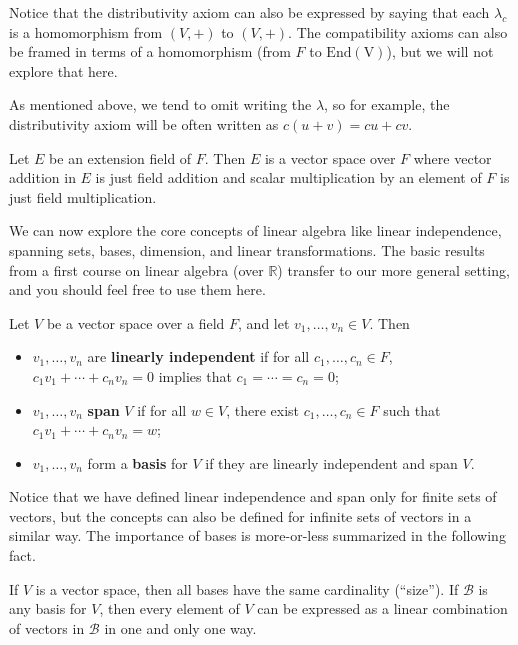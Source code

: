Notice that the distributivity axiom can also be expressed by saying that each $\lambda_c$ is a homomorphism from $(V,+)$ to $(V,+)$. The compatibility axioms can also be framed in terms of a homomorphism (from $F$ to $\operatorname{End(V)}$), but we will not explore that here.

As mentioned above, we tend to omit writing the $\lambda$, so for example, the distributivity axiom will be often written as $c(u+v) = cu+cv$.

\begin{theorem}\label{thm.ExtensionFieldVectorSpace}
Let $E$ be an extension field of $F$. Then $E$ is a vector space over $F$ where vector addition in $E$ is just field addition and scalar multiplication by an element of $F$ is just field multiplication.
\end{theorem}

We can now explore the core concepts of linear algebra like linear independence, spanning sets, bases, dimension, and linear transformations. The basic results from a first course on linear algebra (over $\mathbb{R}$) transfer to our more general setting, and you should feel free to use them here. 

\begin{definition}
Let $V$ be a vector space over a field $F$, and let $v_1, \ldots,v_n\in V$. Then
\begin{itemize}
\item $v_1, \ldots,v_n$ are \textbf{linearly independent} if for all $c_1, \ldots,c_n\in F$, $c_1v_1+ \cdots + c_nv_n = 0$ implies that $c_1  = \cdots = c_n = 0$; 
\item $v_1, \ldots,v_n$ \textbf{span} $V$ if for all $w\in V$, there exist $c_1,  \ldots,c_n\in F$ such that $c_1v_1+ \cdots + c_nv_n = w$;
\item $v_1, \ldots,v_n$ form a \textbf{basis} for $V$ if they are linearly independent and span $V$.
\end{itemize}
\end{definition}

Notice that we have defined linear independence and span only for finite sets of vectors, but the concepts can also be defined for infinite sets of vectors in a similar way. The importance of bases is more-or-less summarized in the following fact.

\begin{fact}
If $V$ is a vector space, then all bases have the same cardinality (``size''). If $\mathcal{B}$ is any basis for $V$, then every element of $V$ can be expressed as a linear combination of vectors in $\mathcal{B}$ in one and only one way.
\end{fact}

